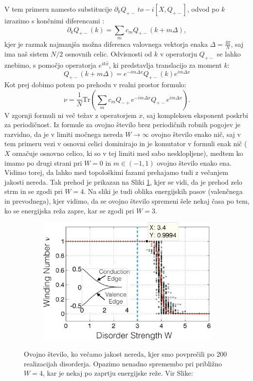 V tem primeru namesto substitucije $\partial_k Q_{+-} \ to -i [X, Q_{+-}]$, odvod po $k$ izrazimo s končnimi diferencami \cite{diference}:
\begin{equation}
\partial_k Q_{+-}(k) = \sum_m c_m Q_{+-} (k+m \Delta ), 
\end{equation}
kjer je razmak najmanjša možna diferenca valovnega vektorja enaka $\Delta  = \frac{4 \pi}{N}$, saj ima naš sistem $N/2$ osnovnih celic.
Odvisnosti od $k$ v operatorju $Q_{+-}$ se lahko znebimo, s pomočjo operatorja $e^{i k \hat{x}}$, ki predstavlja translacijo za moment $k$: 
\begin{equation}
Q_{+-}(k+m \Delta ) =e ^{-i m \Delta  x} Q_{+-}(k) e^{i m \Delta  x}
\end{equation}
Kot prej dobimo potem po prehodu v realni prostor formulo:
\begin{equation}
\nu = \frac{1}{N} \mathrm{Tr} (\sum_m c_m Q_{-+} e^{-im \Delta x} Q_{+-} e^{im \Delta x}).
\end{equation}
V zgornji formuli ni več težav z operatorjem $x$, saj kompleksen eksponent poskrbi za periodičnost.
Iz formule za ovojno število brez periodičnih robnih pogojev je razvidno, da je v limiti močnega nereda $W \to \infty$ ovojno število enako nič, saj v tem primeru vezi v osnovni celici dominirajo in je komutator v formuli enak nič ($X$ označuje osnovno celico, ki so v tej limiti med sabo nesklopljene), medtem ko imamo po drugi strani pri $W=0$ in $m \in (-1,1)$ ovojno število enako ena. Vidimo torej, da lahko med topološkimi fazami prehajamo tudi z večanjem jakosti nereda. Tak prehod je prikazan na Sliki \ref{fig:InvariantVsW}, kjer se vidi, da je prehod zelo strm in se zgodi pri $W=4$. Na sliki je tudi oblika energijskih pasov (valenčnega in prevodnega), kjer vidimo, da se ovojno število spremeni šele nekaj časa po tem, ko se energijska reža zapre, kar se zgodi pri $W=3$.
\begin{figure}[H]
\centering
\begin{subfigure}{.7\textwidth}
\includegraphics[width=\linewidth]{Figures/InvariantVsW.png}
\end{subfigure}
\caption{Ovojno število, ko večamo jakost nereda, kjer smo povprečili po $200$ realizacijah disorderja. Opazimo nenadno spremembo pri približno $W=4$, kar je nekaj po zaprtju energijske reže. Vir Slike: \cite{mondragon}}
\label{fig:InvariantVsW}
\end{figure}

